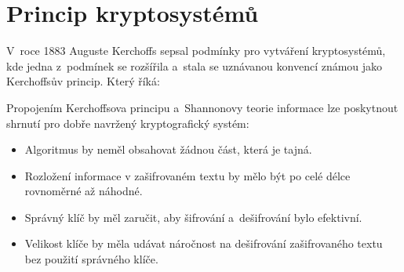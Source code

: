 \section{Princip kryptosystémů}
V~roce 1883 Auguste Kerchoffs sepsal podmínky pro vytváření kryptosystémů, kde jedna z~podmínek se rozšířila a~stala se uznávanou konvencí známou jako Kerchoffsův princip. Který říká: \newline\begin{quote}
    \textit{}
\end{quote}
\newpage
Propojením Kerchoffsova principu a~Shannonovy teorie informace lze poskytnout shrnutí pro dobře navržený kryptografický systém:
\begin{itemize}
    \item Algoritmus by neměl obsahovat žádnou část, která je tajná.
    \item Rozložení informace v zašifrovaném textu by mělo být po celé délce rovnoměrné až náhodné.
    \item Správný klíč by měl zaručit, aby šifrování a~dešifrování bylo efektivní.
    \item Velikost klíče by měla udávat náročnost na dešifrování zašifrovaného textu bez použití správného klíče.\cite{Mao0130669431ISBN}
\end{itemize}

